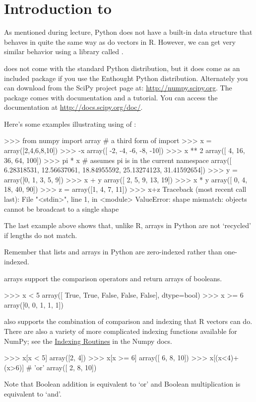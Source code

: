 
\section{Introduction to \numpy}

As mentioned during lecture, Python does not have a built-in data
structure that behaves in quite the same way as do vectors in R.
However, we can get very similar behavior using a library called \numpy.

\numpy does not come with the standard Python distribution, but it does come
as an included package if you use the Enthought Python distribution.
Alternately you can download \numpy from the SciPy project page at:
\url{http://numpy.scipy.org}. The \numpy package comes with documentation and
a tutorial. You can access the documentation at
\url{http://docs.scipy.org/doc/}.

Here's some examples illustrating using of \numpy:
\begin{python}
>>> from numpy import array # a third form of import 
>>> x = array([2,4,6,8,10])
>>> -x
array([ -2,  -4,  -6,  -8, -10])
>>> x ** 2
array([  4,  16,  36,  64, 100])
>>> pi * x # assumes pi is in the current namespace
array([  6.28318531,  12.56637061,  18.84955592,  25.13274123,  31.41592654])
>>> y = array([0, 1, 3, 5, 9])
>>> x + y
array([ 2,  5,  9, 13, 19])
>>> x * y
array([ 0,  4, 18, 40, 90])
>>> z = array([1, 4, 7, 11])
>>> x+z
Traceback (most recent call last):
  File "<stdin>", line 1, in <module>
ValueError: shape mismatch: objects cannot be broadcast to a single shape
\end{python}
%
The last example above shows that, unlike R, \numpy arrays in Python are
not `recycled' if lengths do not match.

Remember that lists and arrays in Python are zero-indexed rather than
one-indexed.
%

\numpy arrays support the comparison operators and return arrays of
booleans.
\begin{python}
    >>> x < 5 
    array([ True, True, False, False, False], dtype=bool)
    >>> x >= 6 
    array([0, 0, 1, 1, 1])
\end{python}
%
\numpy also supports the combination of comparison and indexing that R vectors
can do. There are also a variety of more complicated indexing functions
available for NumPy; see the
\href{http://docs.scipy.org/doc/numpy/reference/routines.indexing.html}{Indexing Routines} in the Numpy docs.
%
\begin{python}
>>> x[x < 5]
array([2, 4])
>>> x[x >= 6]
array([ 6,  8, 10])
>>> x[(x<4)+(x>6)]  # 'or'
array([ 2,  8, 10])
\end{python}
%
Note that Boolean addition is equivalent to `or' and Boolean
multiplication is equivalent to `and'.

